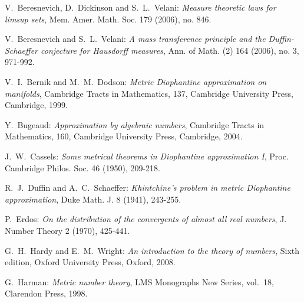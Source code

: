 \documentclass[12pt,reqno]{amsart}
\begin{document}
\begin{thebibliography}{1}

V.~Beresnevich, D.~Dickinson and S.~L.~Velani: \emph{Measure
theoretic laws for limsup sets}, Mem. Amer. Math. Soc. 179 (2006), no. 846.

\vspace*{1ex}

V.~Beresnevich and S.~L.~Velani: \emph{A mass transference principle and the Duffin-Schaeffer conjecture for Hausdorff measures}, Ann. of Math. (2) 164 (2006), no. 3, 971-992.

\vspace*{1ex}

V.~I.~Bernik and M.~M.~Dodson: \emph{Metric Diophantine approximation on manifolds}, Cambridge Tracts in Mathematics, 137, Cambridge University Press, Cambridge, 1999.
\vspace*{1ex}

Y.~Bugeaud: \emph{Approximation by algebraic numbers}, Cambridge Tracts in Mathematics, 160, Cambridge University Press, Cambridge, 2004.

\vspace*{1ex}

J.~W.~Cassels: \emph{Some metrical theorems in Diophantine approximation I}, Proc. Cambridge Philos. Soc. 46 (1950), 209-218.
\vspace*{1ex}

R.~J.~Duffin and A.~C.~Schaeffer: \emph{Khintchine's problem in
metric Diophantine approximation}, Duke Math. J. 8
(1941), 243-255.

\vspace*{1ex}

P.~Erdos: \emph{On the distribution of the convergents of almost all real numbers}, J. Number Theory 2 (1970), 425-441.

\vspace*{1ex}

G.~H.~Hardy and E.~M.~Wright: \emph{An introduction to the theory of numbers}, Sixth edition, Oxford University Press, Oxford, 2008.

\vspace*{1ex}

G.~Harman: \emph{Metric number theory}, LMS Monographs New Series,
vol.~18, Clarendon Press, 1998.

\vspace*{1ex}


\end{thebibliography}
\end{document}
